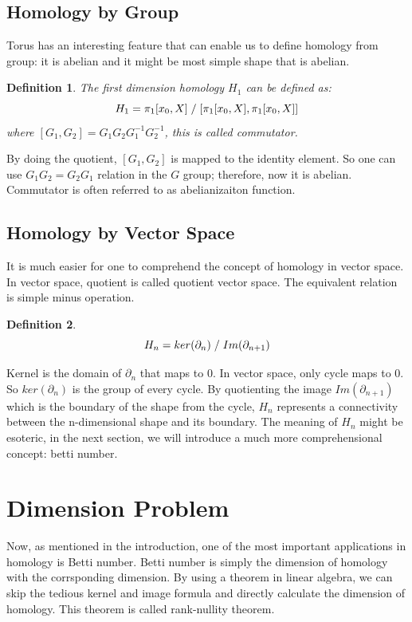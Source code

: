 \documentclass[12pt,letterpaper]{article}
\newtheorem{mydef}{Definition}
\begin{document}
\begin{normalsize}
\subsection{Homology by Group}
Torus has an interesting feature that can enable us to define homology from group: it is abelian and it might be most simple shape that is abelian.

\begin{mydef}\label{def:def444} 
The first dimension homology $H_1$ can be defined as:
$$H_1 = \pi_1[x_0,X] \hspace{1mm} / \hspace{1mm} [\pi_1[x_0,X],\pi_1[x_0,X]]$$
where $[G_1,G_2] = G_1G_2G_1^{-1}G_2^{-1}$, this is called commutator.
\end{mydef}
By doing the quotient,  $[G_1,G_2]$ is mapped to the identity element. So one can use $G_1G_2=G_2G_1$ relation in the $G$ group; therefore, now it is abelian. Commutator is often referred to as abelianizaiton function. 

\subsection{Homology by Vector Space}
It is much easier for one to comprehend the concept of homology in vector space. In vector space, quotient is called quotient vector space. The equivalent relation is simple minus operation.
\begin{mydef}\label{def:def444} 
$$H_n = ker(\partial_n) \hspace{1mm} / \hspace{1mm} Im(\partial_{n+1})$$
\end{mydef}
Kernel is the domain of  $\partial_n$ that maps to 0. In vector space, only cycle maps to 0. So $ker(\partial_n)$ is the group of every cycle. By quotienting the image $Im(\partial_{n+1})$ which is the boundary of the shape from the cycle, $H_n$ represents a connectivity between the n-dimensional shape and its boundary. The meaning of $H_n$ might be esoteric, in the next section, we will introduce a much more comprehensional concept: betti number. 
\section{Dimension Problem}
\hspace{5mm} Now, as mentioned in the introduction, one of the most important applications in homology is Betti number. Betti number is simply the dimension of homology with the corrsponding dimension. By using a theorem in linear algebra, we can skip the tedious kernel and image formula and directly calculate the dimension of homology. This theorem is called rank-nullity theorem.

\end{normalsize}
\end{document}
